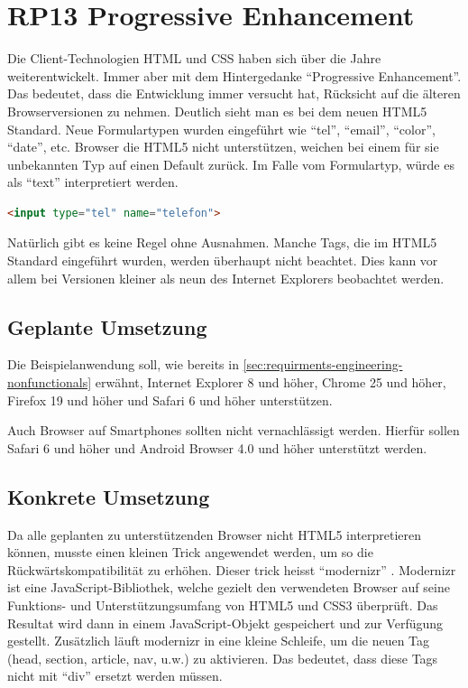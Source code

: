 \section{RP13 Progressive Enhancement}
\label{sec:principle-rp13-progressive-enhancement}

Die Client-Technologien HTML und CSS haben sich über die Jahre weiterentwickelt. Immer aber mit dem Hintergedanke ``Progressive Enhancement''. Das bedeutet, dass die Entwicklung immer versucht hat, Rücksicht auf die älteren Browserversionen zu nehmen.
Deutlich sieht man es bei dem neuen HTML5 Standard. Neue Formulartypen wurden eingeführt wie ``tel'', ``email'', ``color'', ``date'', etc. Browser die HTML5 nicht unterstützen, weichen bei einem für sie unbekannten Typ auf einen Default zurück. Im Falle vom Formulartyp, würde es als ``text'' interpretiert werden.

\begin{lstlisting}[language=HTML, caption={Inputfeld in HTML5, welches eine Telefonnummer erwartet}, label={lst:html5TelInput}]
<input type="tel" name="telefon">
\end{lstlisting}

Natürlich gibt es keine Regel ohne Ausnahmen. Manche Tags, die im HTML5 Standard eingeführt wurden, werden überhaupt nicht beachtet. Dies kann vor allem bei Versionen kleiner als neun des Internet Explorers beobachtet werden.

\subsection*{Geplante Umsetzung}
Die Beispielanwendung soll, wie bereits in \ref{sec:requirments-engineering-nonfunctionals} erwähnt, Internet Explorer 8 und höher, Chrome 25 und höher, Firefox 19 und höher und Safari 6 und höher unterstützen.

Auch Browser auf Smartphones sollten nicht vernachlässigt werden. Hierfür sollen Safari 6 und höher und Android Browser 4.0 und höher unterstützt werden.

\subsection*{Konkrete Umsetzung}
Da alle geplanten zu unterstützenden Browser nicht HTML5 interpretieren können, musste einen kleinen Trick angewendet werden, um so die Rückwärtskompatibilität zu erhöhen. Dieser trick heisst ``modernizr'' \cite{modernizr}. Modernizr ist eine JavaScript-Bibliothek, welche gezielt den verwendeten Browser auf seine Funktions- und Unterstützungsumfang von HTML5 und CSS3 überprüft. Das Resultat wird dann in einem JavaScript-Objekt gespeichert und zur Verfügung gestellt.  Zusätzlich läuft modernizr in eine kleine Schleife, um die neuen Tag (head, section, article, nav, u.w.) zu aktivieren. Das bedeutet, dass diese Tags nicht mit ``div'' ersetzt werden müssen.

